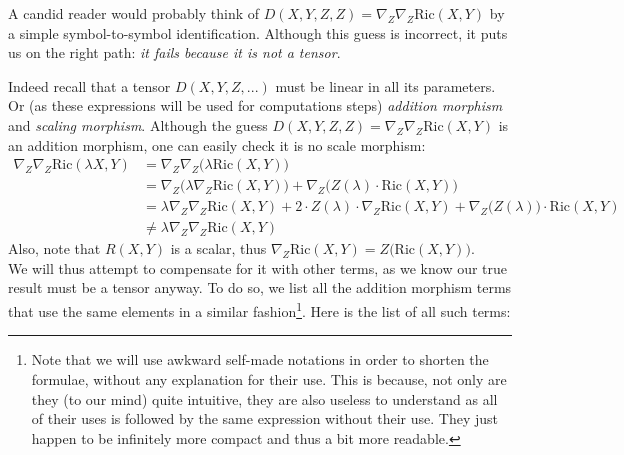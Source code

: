 \documentclass[a4paper,11pt]{article}
\numberwithin{equation}{section}
\theoremstyle{definition}
\newcommand{\R}{{\mathrm{Ric}}}
\begin{document}
A candid reader would probably think of $D(X,Y,Z,Z)=\nabla_Z \nabla_Z \R(X,Y)$ by a simple symbol-to-symbol identification. Although this guess is incorrect, it puts us on the right path: \emph{it fails because it is not a tensor}.

Indeed recall that a tensor $D(X,Y,Z,...)$ must be linear in all its parameters. Or (as these expressions will be used for computations steps) \emph{addition morphism} and \emph{scaling morphism}. Although the guess $D(X,Y,Z,Z)=\nabla_Z \nabla_Z \R(X,Y)$ is an addition morphism, one can easily check it is no scale morphism:
\begin{align*}
\nabla_Z \nabla_Z \R(\lambda X,Y)
    &=\nabla_Z \nabla_Z\big( \lambda \R(X,Y) \big)\\
    &= \nabla_Z \big(\lambda\nabla_Z \R(X,Y) \big)
    + \nabla_Z \big( Z(\lambda) \cdot \R(X,Y) \big)\\
    &= \lambda \nabla_Z \nabla_Z \R(X,Y)
    + 2 \cdot Z(\lambda) \cdot \nabla_Z \R(X,Y)
    + \nabla_Z \big( Z(\lambda)\big) \cdot \R(X,Y)\\
    &\ne \lambda \nabla_Z \nabla_Z \R(X,Y)
\end{align*}
Also, note that $R(X,Y)$ is a scalar, thus $\nabla_Z\R(X,Y)=Z\big(\R(X,Y)\big)$.\\

We will thus attempt to compensate for it with other terms, as we know our true result must be a tensor anyway. To do so, we list all the addition morphism terms that use the same elements in a similar fashion\footnote{Note that we will use awkward self-made notations in order to shorten the formulae, without any explanation for their use. This is because, not only are they (to our mind) quite intuitive, they are also useless to understand as all of their uses is followed by the same expression without their use. They just happen to be infinitely more compact and thus a bit more readable.}. Here is the list of all such terms:
\end{document}
